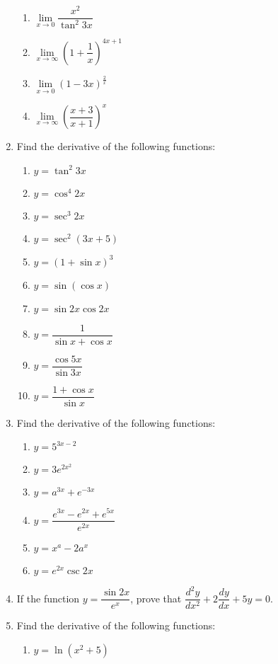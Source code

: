 \documentclass[12pt]{report}
\begin{document}
\begin{enumerate}
\begin{enumerate}
          \item $\lim\limits_{x\to0}\dfrac{x^{2}}{\tan^{2}3x}$
          \item $\lim\limits_{x\to\infty}\left(1+{\dfrac{1}{x}}\right)^{4x+1}$
          \item $\lim\limits_{x\to0}\left(1-3x\right)^{\frac{2}{x}}$
          \item $\lim\limits_{x\to\infty}\left({\dfrac{x+3}{x+1}}\right)^{x}$
        \end{enumerate}
  \item Find the derivative of the following functions:
        \begin{enumerate}
          \item $y=\tan^{2}3x$
          \item $y=\cos^{4}2x$
          \item $y=\sec^{3}2x$
          \item $y=\sec^{2}(3x+5)$
          \item $y=(1+\sin x)^{3}$
          \item $y=\sin\left(\cos x\right)$
          \item $y=\sin2x\cos2x$
          \item $y={\dfrac{1}{\sin x+\cos x}}$
          \item $y={\dfrac{\cos 5x}{\sin 3x}}$
          \item $y={\dfrac{1+\cos x}{\sin x}}$
        \end{enumerate}
  \item Find the derivative of the following functions:
        \begin{enumerate}
          \item $y=5^{3x-2}$
          \item $y=3e^{2x^{2}}$
          \item $y=a^{3x}+e^{-3x}$
          \item $y={\dfrac{e^{3x}-e^{2x}+e^{5x}}{e^{2x}}}$
          \item $y=x^{a}-2a^{x}$
          \item $y=e^{2x}\csc2x$
        \end{enumerate}
  \item If the function $y = \dfrac{\sin 2x}{e^x}$, prove that $\dfrac{d^2y}{dx^2} +
          2\dfrac{dy}{dx} + 5y = 0$.
  \item Find the derivative of the following functions:
        \begin{enumerate}
          \item $y=\ln\left(x^{2}+5\right)$

\end{enumerate}
\end{enumerate}
\end{document}
